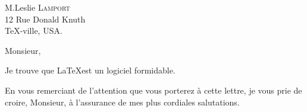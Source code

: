 \documentclass[12pt]{lettre}
\title{}
\author{}
\date{\today}
\makeatletter
\newcommand*{\NoRule}{\renewcommand*{\rule@length}{0}}
\makeatother
\begin{document}
\begin{letter}{%
M.Leslie \textsc{Lamport}\\
12 Rue Donald Knuth \\
\TeX-ville, USA.
}


\NoRule
\marge{-0.3cm}
\def\concname{Objet :~} %


\address{Jean-Random \textsc{Hacker}\\ %
42 rue Douglas Adams \\
31337 Perpette-les-Oies}




\nofax

\opening{Monsieur,}
Je trouve que \LaTeX est un logiciel formidable. 
\closing{En vous remerciant de l’attention que vous porterez à cette lettre, 
je vous prie de croire, Monsieur, à l’assurance de mes plus cordiales salutations.}
\end{letter}
\end{document}
